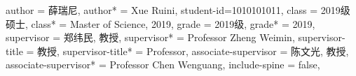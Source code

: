 {  %
  author  = {薛瑞尼},
  author* = {Xue Ruini},
  student-id={1010101011},
  class = {2019级硕士},
  class* = {Master of Science, 2019},
  grade = {2019级},
  grade* = {2019},
  supervisor  = {郑纬民, 教授},
  supervisor* = {Professor Zheng Weimin},
  supervisor-title = {教授},
  supervisor-title* = {Professor},
  associate-supervisor	= {陈文光, 教授},
  associate-supervisor* = {Professor Chen Wenguang},
  include-spine = false,
}


\usepackage{amsthm}



\usepackage{threeparttable}

\usepackage{multirow}


\usepackage{longtable}

\usepackage{algorithm}
\usepackage{algorithmic}

\usepackage{siunitx}

\usepackage{enumitem}

\usepackage[sort]{natbib}


